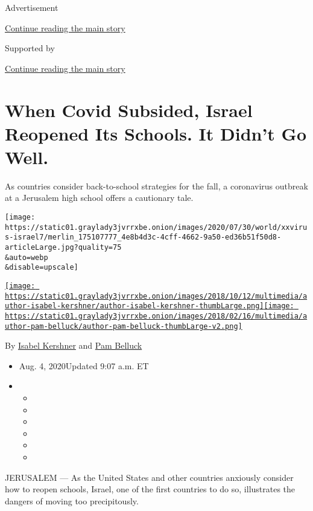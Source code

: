 Advertisement

\protect\hyperlink{after-top}{Continue reading the main story}

Supported by

\protect\hyperlink{after-sponsor}{Continue reading the main story}

\hypertarget{when-covid-subsided-israel-reopened-its-schools-it-didnt-go-well}{%
\section{When Covid Subsided, Israel Reopened Its Schools. It Didn't Go
Well.}\label{when-covid-subsided-israel-reopened-its-schools-it-didnt-go-well}}

As countries consider back-to-school strategies for the fall, a
coronavirus outbreak at a Jerusalem high school offers a cautionary
tale.

\texttt{[image: https://static01.graylady3jvrrxbe.onion/images/2020/07/30/world/xxvirus-israel7/merlin\_175107777\_4e8b4d3c-4cff-4662-9a50-ed36b51f50d8-articleLarge.jpg?quality=75\\\&auto=webp\\\&disable=upscale]}

\href{https://www.nytimes3xbfgragh.onion/by/isabel-kershner}{\texttt{[image: https://static01.graylady3jvrrxbe.onion/images/2018/10/12/multimedia/author-isabel-kershner/author-isabel-kershner-thumbLarge.png]}}\href{https://www.nytimes3xbfgragh.onion/by/pam-belluck}{\texttt{[image: https://static01.graylady3jvrrxbe.onion/images/2018/02/16/multimedia/author-pam-belluck/author-pam-belluck-thumbLarge-v2.png]}}

By \href{https://www.nytimes3xbfgragh.onion/by/isabel-kershner}{Isabel
Kershner} and
\href{https://www.nytimes3xbfgragh.onion/by/pam-belluck}{Pam Belluck}

\begin{itemize}
\item
  Aug. 4, 2020Updated 9:07 a.m. ET
\item
  \begin{itemize}
  \item
  \item
  \item
  \item
  \item
  \item
  \end{itemize}
\end{itemize}

JERUSALEM --- As the United States and other countries anxiously
consider how to reopen schools, Israel, one of the first countries to do
so, illustrates the dangers of moving too precipitously.

